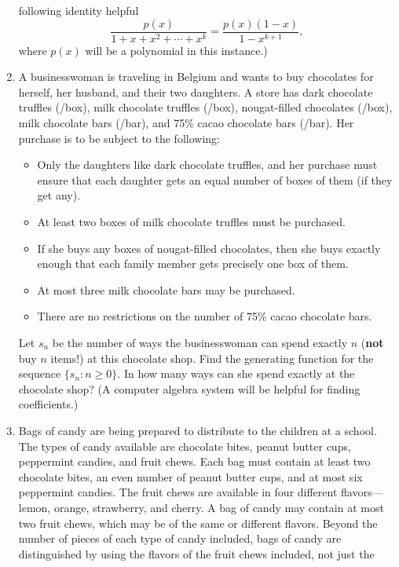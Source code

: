 \begin{enumerate}
  following identity helpful
  \[\frac{p(x)}{1+x+x^2+\cdots + x^k} = \frac{p(x)(1-x)}{1-x^{k+1}},\]
  where $p(x)$ will be a polynomial in this instance.)
\item A businesswoman is traveling in Belgium and wants to
  buy chocolates for herself, her husband, and their two daughters. A
  store has dark chocolate truffles (\EURdig{}/box), milk
  chocolate truffles (\EURdig{}/box), nougat-filled
  chocolates (\EURdig{}/box), milk chocolate bars
  (\EURdig{}/bar), and 75\% cacao chocolate bars
  (\EURdig{}/bar). Her purchase is to be subject to the
  following:
  \begin{itemize}
  \item Only the daughters like dark chocolate truffles, and her
    purchase must ensure that each daughter gets an equal number of
    boxes of them (if they get any).
  \item At least two boxes of milk chocolate truffles must be
    purchased.
  \item If she buys any boxes of nougat-filled chocolates, then she
    buys exactly enough that each family member gets precisely one
    box of them.
  \item At most three milk chocolate bars may be purchased.
  \item There are no restrictions on the number of 75\% cacao
    chocolate bars.
  \end{itemize}
  Let $s_n$ be the number of ways the businesswoman can spend exactly
  \EURdig\thinspace $n$ (\textbf{not} buy $n$ items!) at this
  chocolate shop. Find the generating function for the sequence
  $\{s_n\colon n\geq 0\}$. In how many ways can she spend exactly
  \EURdig{} at the chocolate shop? (A computer algebra
  system will be helpful for finding coefficients.)
\item Bags of candy are being prepared to distribute to the children
  at a school. The types of candy available are chocolate bites,
  peanut butter cups, peppermint candies, and fruit chews. Each bag
  must contain at least two chocolate bites, an even number of peanut
  butter cups, and at most six peppermint candies. The fruit chews are
  available in four different flavors---lemon, orange, strawberry, and
  cherry. A bag of candy may contain at most two fruit chews, which
  may be of the same or different flavors. Beyond the number of pieces
  of each type of candy included, bags of candy are distinguished by
  using the flavors of the fruit chews included, not just the

\end{enumerate}
